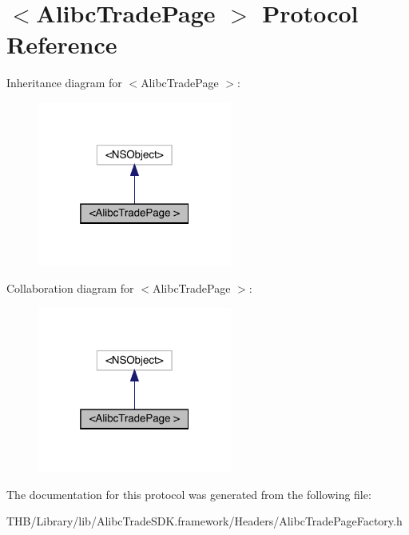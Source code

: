 \hypertarget{protocol_alibc_trade_page_01-p}{}\section{$<$Alibc\+Trade\+Page $>$ Protocol Reference}
\label{protocol_alibc_trade_page_01-p}


Inheritance diagram for $<$Alibc\+Trade\+Page $>$\+:\nopagebreak
\begin{figure}[H]
\begin{center}
\leavevmode
\includegraphics[width=181pt]{protocol_alibc_trade_page_01-p__inherit__graph}
\end{center}
\end{figure}


Collaboration diagram for $<$Alibc\+Trade\+Page $>$\+:\nopagebreak
\begin{figure}[H]
\begin{center}
\leavevmode
\includegraphics[width=181pt]{protocol_alibc_trade_page_01-p__coll__graph}
\end{center}
\end{figure}


The documentation for this protocol was generated from the following file\+:\begin{DoxyCompactItemize}
\item 
T\+H\+B/\+Library/lib/\+Alibc\+Trade\+S\+D\+K.\+framework/\+Headers/Alibc\+Trade\+Page\+Factory.\+h\end{DoxyCompactItemize}
